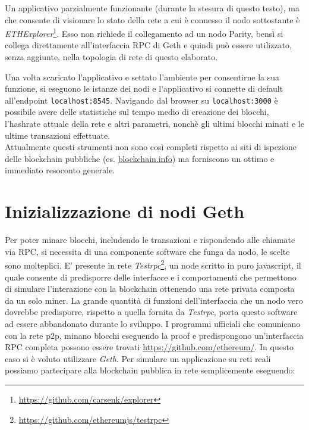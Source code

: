 \begin{appendices}
	Un applicativo parzialmente funzionante (durante la stesura di questo testo), ma che consente di visionare lo stato della rete a cui è connesso il nodo sottostante è \textit{ETHExplorer}\footnote{\url{https://github.com/carsenk/explorer}}. Esso non richiede il collegamento ad un nodo Parity, bensì si collega direttamente all'interfaccia RPC di Geth e quindi può essere utilizzato, senza aggiunte, nella topologia di rete di questo elaborato.
	
	Una volta scaricato l'applicativo e settato l'ambiente per consentirne la sua funzione, si eseguono le istanze dei nodi e l'applicativo si connette di default all'endpoint  \lstinline|localhost:8545|. 
	Navigando dal browser su  \lstinline|localhost:3000| è possibile avere delle statistiche sul tempo medio di creazione dei blocchi, l'hashrate attuale della rete e altri parametri, nonchè gli ultimi blocchi minati e le ultime transazioni effettuate.\\
	
	Attualmente questi strumenti non sono così completi rispetto ai siti di ispezione delle blockchain pubbliche (es. \url{blockchain.info}) ma forniscono un ottimo e immediato resoconto generale.
	
	\section{Inizializzazione di nodi Geth}\label{appendice:b}
		
		
		Per poter minare blocchi, includendo le transazioni e rispondendo alle chiamate via RPC, si necessita di una componente software che funga da nodo, le scelte sono molteplici. E' presente in rete \textit{Testrpc}\footnote{\url{https://github.com/ethereumjs/testrpc}}, un node scritto in puro javascript, il quale consente di predisporre delle interfacce e i comportamenti che permettono di simulare l'interazione con la blockchain ottenendo una rete privata composta da un solo miner. La grande quantità di funzioni dell'interfaccia che un nodo vero dovrebbe predisporre, rispetto a quella fornita da \textit{Testrpc}, porta questo software ad essere abbandonato durante lo sviluppo. 
		I programmi ufficiali che comunicano con la rete p2p, minano blocchi eseguendo la proof e predispongono un'interfaccia RPC completa possono essere trovati \url{https://github.com/ethereum/}. 
		In questo caso si è voluto utilizzare \textit{Geth}.
		Per simulare un applicazione su reti reali possiamo partecipare alla blockchain pubblica in rete semplicemente eseguendo:
		

\end{appendices}
